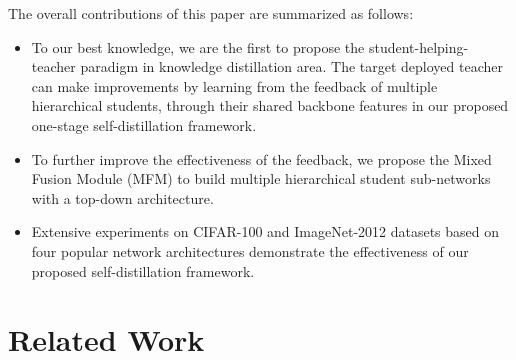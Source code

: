 \documentclass[letterpaper]{article} %
\newcommand{\rewrite}[1]{{\textcolor{red}{#1}}}
\begin{document}
The overall contributions of this paper are summarized as follows:
\begin{itemize}
	\item To our best knowledge, we are the first to propose the student-helping-teacher paradigm in knowledge distillation area. The target deployed teacher can make improvements by learning from the feedback of multiple hierarchical students, through their shared backbone features in our proposed one-stage self-distillation framework.
	\item To further improve the effectiveness of the feedback, we propose the Mixed Fusion Module (MFM) to build multiple hierarchical student sub-networks with a top-down architecture.
	\item Extensive experiments on CIFAR-100 and ImageNet-2012 datasets 
	based on four popular network architectures demonstrate the effectiveness of our proposed self-distillation framework.
\end{itemize}





\section{Related Work}
\end{document}
